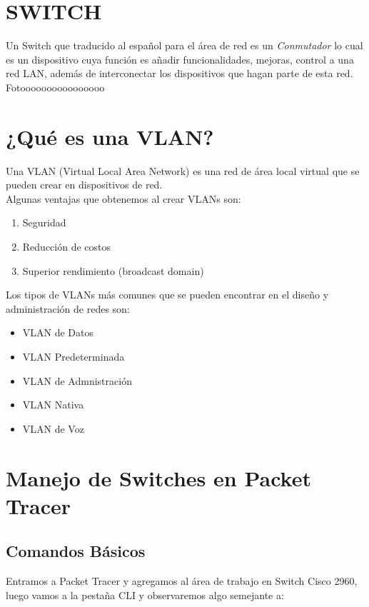 \documentclass[journal]{IEEEtran}
\begin{document}
\section{\textbf{SWITCH}}
Un Switch que traducido al español para el área de red es un \textit{Conmutador} lo cual es un dispositivo cuya función es añadir funcionalidades, mejoras, control a una red LAN, además de interconectar los dispositivos que hagan parte de esta red.
Fotoooooooooooooooo

\section{\textbf{¿Qué es una VLAN?}}
Una VLAN (Virtual Local Area Network) es una red de área local virtual que se pueden crear en dispositivos de red. \\
Algunas ventajas que obtenemos al crear VLANs son:
\begin{enumerate}
	\item Seguridad
	\item Reducción de costos
	\item Superior rendimiento (broadcast domain)
\end{enumerate}

Los tipos de VLANs más comunes que se pueden encontrar en el diseño y administración de redes son:
\begin{itemize}
	\item VLAN de Datos
	\item VLAN Predeterminada
	\item VLAN de Admnistración
	\item VLAN Nativa
	\item VLAN de Voz
\end{itemize}

\section{\textbf{Manejo de Switches en Packet Tracer}}

\subsection{\textbf{Comandos Básicos}}
Entramos a Packet Tracer y agregamos al área de trabajo en Switch Cisco 2960, luego vamos a la pestaña CLI y observaremos algo semejante a:
\end{document}
